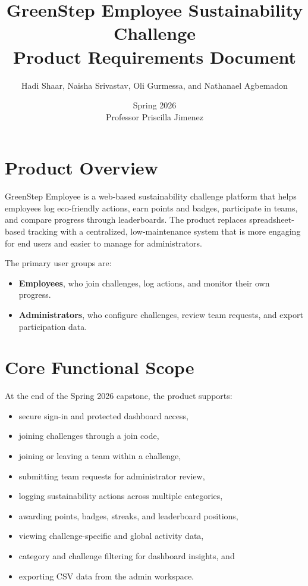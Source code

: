 \documentclass[12pt]{article}
\title{\textbf{GreenStep Employee Sustainability Challenge}\\
\large Product Requirements Document}
\author{Hadi Shaar, Naisha Srivastav, Oli Gurmessa, and Nathanael Agbemadon}
\date{Spring 2026 \\ Professor Priscilla Jimenez}
\begin{document}
\maketitle

\section{Product Overview}

GreenStep Employee is a web-based sustainability challenge platform that helps
employees log eco-friendly actions, earn points and badges, participate in
teams, and compare progress through leaderboards. The product replaces
spreadsheet-based tracking with a centralized, low-maintenance system that is
more engaging for end users and easier to manage for administrators.

The primary user groups are:
\begin{itemize}[leftmargin=1.5em]
    \item \textbf{Employees}, who join challenges, log actions, and monitor
    their own progress.
    \item \textbf{Administrators}, who configure challenges, review team
    requests, and export participation data.
\end{itemize}

\section{Core Functional Scope}

At the end of the Spring 2026 capstone, the product supports:
\begin{itemize}[leftmargin=1.5em]
    \item secure sign-in and protected dashboard access,
    \item joining challenges through a join code,
    \item joining or leaving a team within a challenge,
    \item submitting team requests for administrator review,
    \item logging sustainability actions across multiple categories,
    \item awarding points, badges, streaks, and leaderboard positions,
    \item viewing challenge-specific and global activity data,
    \item category and challenge filtering for dashboard insights, and
    \item exporting CSV data from the admin workspace.
\end{itemize}
\end{document}

